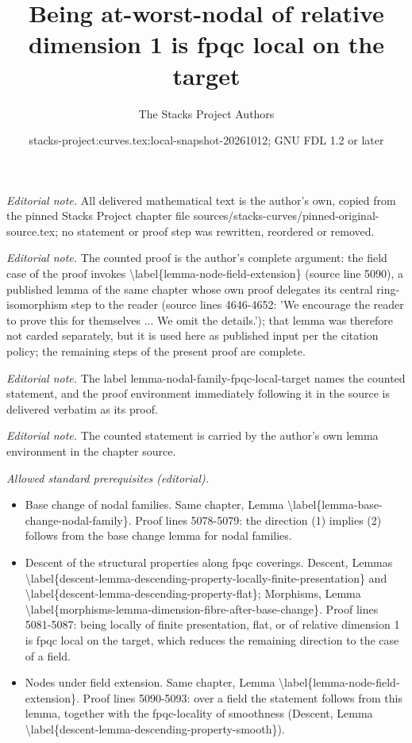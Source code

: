 \documentclass[10pt,a4paper]{amsart}
\title{Being at-worst-nodal of relative dimension 1 is fpqc local on the target}
\author{The Stacks Project Authors}
\date{stacks-project:curves.tex:local-snapshot-20261012; GNU FDL 1.2 or later}
\theoremstyle{plain}
\theoremstyle{definition}
\theoremstyle{remark}
\numberwithin{equation}{subsection}
\begin{document}
\maketitle
\noindent\textit{Editorial note.} All delivered mathematical text is the author's own, copied from the pinned Stacks Project chapter file sources/stacks-curves/pinned-original-source.tex; no statement or proof step was rewritten, reordered or removed.\par\medskip
\noindent\textit{Editorial note.} The counted proof is the author's complete argument: the field case of the proof invokes \textbackslash{}label\{lemma-node-field-extension\} (source line 5090), a published lemma of the same chapter whose own proof delegates its central ring-isomorphism step to the reader (source lines 4646-4652: 'We encourage the reader to prove this for themselves ... We omit the details.'); that lemma was therefore not carded separately, but it is used here as published input per the citation policy; the remaining steps of the present proof are complete.\par\medskip
\noindent\textit{Editorial note.} The label lemma-nodal-family-fpqc-local-target names the counted statement, and the proof environment immediately following it in the source is delivered verbatim as its proof.\par\medskip
\noindent\textit{Editorial note.} The counted statement is carried by the author's own lemma environment in the chapter source.\par\medskip
\noindent\textit{Allowed standard prerequisites (editorial).}\begin{itemize}
\item Base change of nodal families. Same chapter, Lemma \textbackslash{}label\{lemma-base-change-nodal-family\}. Proof lines 5078-5079: the direction (1) implies (2) follows from the base change lemma for nodal families.
\item Descent of the structural properties along fpqc coverings. Descent, Lemmas \textbackslash{}label\{descent-lemma-descending-property-locally-finite-presentation\} and \textbackslash{}label\{descent-lemma-descending-property-flat\}; Morphisms, Lemma \textbackslash{}label\{morphisms-lemma-dimension-fibre-after-base-change\}. Proof lines 5081-5087: being locally of finite presentation, flat, or of relative dimension 1 is fpqc local on the target, which reduces the remaining direction to the case of a field.
\item Nodes under field extension. Same chapter, Lemma \textbackslash{}label\{lemma-node-field-extension\}. Proof lines 5090-5093: over a field the statement follows from this lemma, together with the fpqc-locality of smoothness (Descent, Lemma \textbackslash{}label\{descent-lemma-descending-property-smooth\}).
\end{itemize}\medskip
\end{document}
